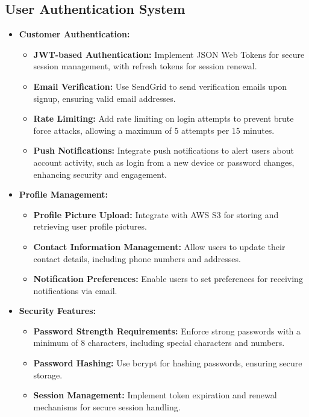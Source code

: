 \subsection{User Authentication System}
\begin{itemize}[leftmargin=*]
    \item \textbf{Customer Authentication:}
    \begin{itemize}
        \item \textbf{JWT-based Authentication:} Implement JSON Web Tokens for secure session management, with refresh tokens for session renewal.
        \item \textbf{Email Verification:} Use SendGrid to send verification emails upon signup, ensuring valid email addresses.
        \item \textbf{Rate Limiting:} Add rate limiting on login attempts to prevent brute force attacks, allowing a maximum of 5 attempts per 15 minutes.
            \item \textbf{Push Notifications:} Integrate push notifications to alert users about account activity, such as login from a new device or password changes, enhancing security and engagement.

    \end{itemize}
    
  
    
    \item \textbf{Profile Management:}
    \begin{itemize}
        \item \textbf{Profile Picture Upload:} Integrate with AWS S3 for storing and retrieving user profile pictures.
        \item \textbf{Contact Information Management:} Allow users to update their contact details, including phone numbers and addresses.
        \item \textbf{Notification Preferences:} Enable users to set preferences for receiving notifications via email.
    \end{itemize}
    
    \item \textbf{Security Features:}
    \begin{itemize}
        \item \textbf{Password Strength Requirements:} Enforce strong passwords with a minimum of 8 characters, including special characters and numbers.
        \item \textbf{Password Hashing:} Use bcrypt for hashing passwords, ensuring secure storage.
        \item \textbf{Session Management:} Implement token expiration and renewal mechanisms for secure session handling.
    \end{itemize}
\end{itemize}

